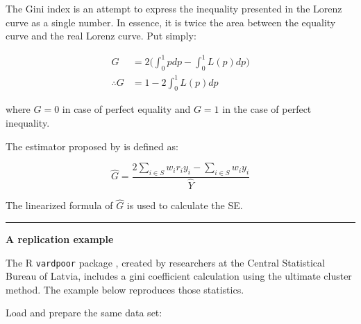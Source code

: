\documentclass[]{book}
\begin{document}
The Gini index is an attempt to express the inequality presented in the Lorenz curve as a single number. In essence, it is twice the area between the equality curve and the real Lorenz curve. Put simply:

\[
\begin{aligned}
G &= 2 \bigg( \int_{0}^{1} pdp - \int_{0}^{1} L(p)dp \bigg) \\
\therefore G &= 1 - 2 \int_{0}^{1} L(p)dp
\end{aligned}
\]

where \(G=0\) in case of perfect equality and \(G = 1\) in the case of perfect inequality.

The estimator proposed by \citet{osier2009} is defined as:

\[
\widehat{G} = \frac{ 2 \sum_{i \in S} w_i r_i y_i - \sum_{i \in S} w_i y_i }{ \hat{Y} }
\]

The linearized formula of \(\widehat{G}\) is used to calculate the SE.

\begin{center}\rule{0.5\linewidth}{0.5pt}\end{center}

\textbf{A replication example}

The R \texttt{vardpoor} package \citep{vardpoor}, created by researchers at the Central Statistical Bureau of Latvia, includes a gini coefficient calculation using the ultimate cluster method. The example below reproduces those statistics.

Load and prepare the same data set:
\end{document}
